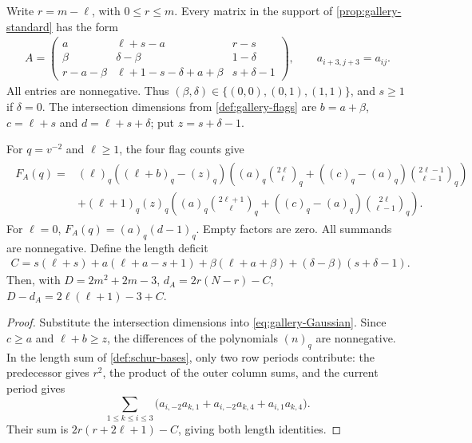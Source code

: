 \documentclass[a4paper,11pt]{amsart}
\numberwithin{equation}{subsection}
\theoremstyle{plain}
\theoremstyle{definition}
\theoremstyle{remark}
\newcommand{\gbinom}[2]{\binom{#1}{#2}}
\begin{document}
\begin{definition}\label{def:relevance-parameters}
Write $r=m-\ell$, with $0\le r\le m$. Every matrix in the support
of \autoref{prop:gallery-standard} has the form
\begin{gather*}
A=\begin{pmatrix}
a&\ell+s-a&r-s\\
\beta&\delta-\beta&1-\delta\\
r-a-\beta&\ell+1-s-\delta+a+\beta&s+\delta-1
\end{pmatrix},\qquad a_{i+3,j+3}=a_{ij}.
\end{gather*}
All entries are nonnegative. Thus
$(\beta,\delta)\in\{(0,0),(0,1),(1,1)\}$, and $s\ge1$ if $\delta=0$.
The intersection dimensions from \autoref{def:gallery-flags} are
$b=a+\beta$, $c=\ell+s$ and $d=\ell+s+\delta$; put $z=s+\delta-1$.
\end{definition}

\begin{lemma}\label{lem:gallery-degrees}
For $q=v^{-2}$ and $\ell\ge1$, the four flag counts give
\begin{gather}\label{eq:relevance-four-terms}
\begin{aligned}
F_A(q)={}&(\ell)_q((\ell+b)_q-(z)_q)
\left((a)_q\gbinom{2\ell}{\ell}_q+
((c)_q-(a)_q)\gbinom{2\ell-1}{\ell-1}_q\right)\\
&+(\ell+1)_q(z)_q
\left((a)_q\gbinom{2\ell+1}{\ell}_q+
((c)_q-(a)_q)\gbinom{2\ell}{\ell-1}_q\right).
\end{aligned}
\end{gather}
For $\ell=0$, $F_A(q)=(a)_q(d-1)_q$. Empty factors are zero.
All summands are nonnegative. Define the length deficit
\begin{gather*}
C=s(\ell+s)+a(\ell+a-s+1)+\beta(\ell+a+\beta)
+(\delta-\beta)(s+\delta-1).
\end{gather*}
Then, with $D=2m^2+2m-3$,
$d_A=2r(N-r)-C$, $D-d_A=2\ell(\ell+1)-3+C$.
\end{lemma}

\begin{proof}
Substitute the intersection dimensions into
\autoref{eq:gallery-Gaussian}. Since $c\ge a$ and $\ell+b\ge z$,
the differences of the polynomials $(n)_q$ are nonnegative.
In the length sum of \autoref{def:schur-bases}, only two row periods
contribute: the predecessor gives $r^2$, the product of the outer
column sums, and the current period gives
\[
\sum_{1\le k\le i\le3}
\bigl(a_{i,-2}a_{k,1}+a_{i,-2}a_{k,4}+a_{i,1}a_{k,4}\bigr).
\]
Their sum is $2r(r+2\ell+1)-C$, giving both length identities.
\end{proof}
\end{document}
